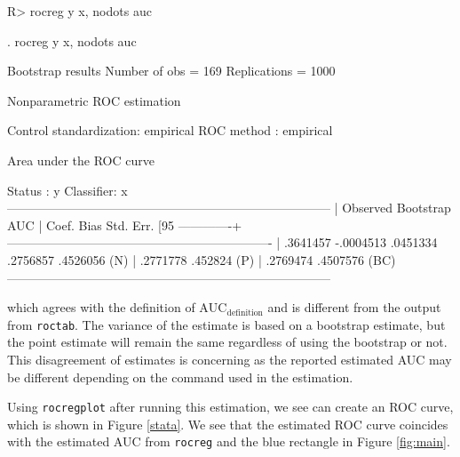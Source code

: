 \documentclass[article]{jss}
\begin{document}
\begin{CodeChunk}

\begin{CodeInput}
R> rocreg y x, nodots auc
\end{CodeInput}


\begin{CodeOutput}
 . rocreg y x, nodots auc

Bootstrap results                               Number of obs      =       169
                                                Replications       =      1000

Nonparametric ROC estimation

Control standardization: empirical
ROC method             : empirical

Area under the ROC curve

   Status    : y
   Classifier: x
------------------------------------------------------------------------------
             |    Observed               Bootstrap
         AUC |       Coef.       Bias    Std. Err.     [95%
-------------+----------------------------------------------------------------
             |    .3641457  -.0004513    .0451334     .2756857   .4526056  (N)
             |                                        .2771778    .452824  (P)
             |                                        .2769474   .4507576 (BC)
------------------------------------------------------------------------------
\end{CodeOutput}
\end{CodeChunk}

which agrees with the definition of \(\text{AUC}_{\text{definition}}\)
and is different from the output from \texttt{roctab}. The variance of
the estimate is based on a bootstrap estimate, but the point estimate
will remain the same regardless of using the bootstrap or not. This
disagreement of estimates is concerning as the reported estimated AUC
may be different depending on the command used in the estimation.

Using \texttt{rocregplot} after running this estimation, we see can
create an ROC curve, which is shown in Figure \ref{stata}. We see that
the estimated ROC curve coincides with the estimated AUC from
\texttt{rocreg} and the blue rectangle in Figure \ref{fig:main}.
\end{document}
